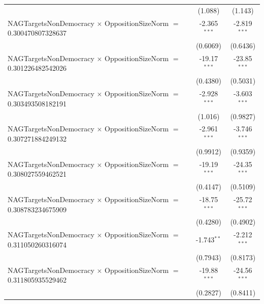 \begin{tabular}{lcc}
                                                                                & (1.088)              & (1.143)\\   
   NAGTargetsNonDemocracy $\times$ OppositionSizeNorm $=$ 0.300470807328637     & -2.365$^{***}$       & -2.819$^{***}$\\   
                                                                                & (0.6069)             & (0.6436)\\   
   NAGTargetsNonDemocracy $\times$ OppositionSizeNorm $=$ 0.301226482542026     & -19.17$^{***}$       & -23.85$^{***}$\\   
                                                                                & (0.4380)             & (0.5031)\\   
   NAGTargetsNonDemocracy $\times$ OppositionSizeNorm $=$ 0.303493508182191     & -2.928$^{***}$       & -3.603$^{***}$\\   
                                                                                & (1.016)              & (0.9827)\\   
   NAGTargetsNonDemocracy $\times$ OppositionSizeNorm $=$ 0.307271884249132     & -2.961$^{***}$       & -3.746$^{***}$\\   
                                                                                & (0.9912)             & (0.9359)\\   
   NAGTargetsNonDemocracy $\times$ OppositionSizeNorm $=$ 0.308027559462521     & -19.19$^{***}$       & -24.35$^{***}$\\   
                                                                                & (0.4147)             & (0.5109)\\   
   NAGTargetsNonDemocracy $\times$ OppositionSizeNorm $=$ 0.308783234675909     & -18.75$^{***}$       & -25.72$^{***}$\\   
                                                                                & (0.4280)             & (0.4902)\\   
   NAGTargetsNonDemocracy $\times$ OppositionSizeNorm $=$ 0.311050260316074     & -1.743$^{**}$        & -2.212$^{***}$\\   
                                                                                & (0.7943)             & (0.8173)\\   
   NAGTargetsNonDemocracy $\times$ OppositionSizeNorm $=$ 0.311805935529462     & -19.88$^{***}$       & -24.56$^{***}$\\   
                                                                                & (0.2827)             & (0.8411)\\   

\end{tabular}

